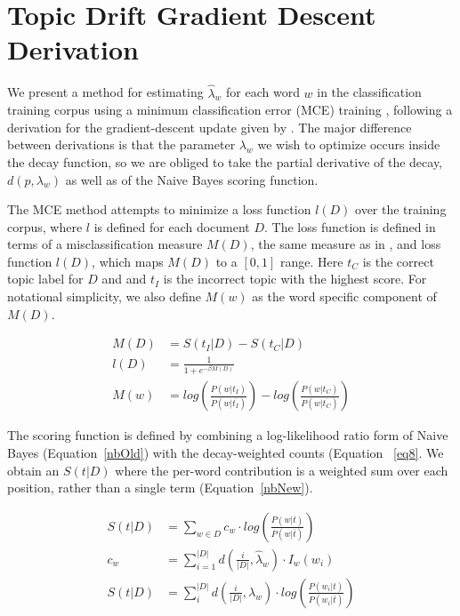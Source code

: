 \newpage
\appendix
\chapter{Topic Drift Gradient Descent Derivation} 

We present a method for estimating $\widehat{\lambda}_w$ for each word $w$ in the classification training corpus using a minimum classification error (MCE) training \cite{juang1992}, following a derivation for the gradient-descent update given by \cite{hazen2008}.   The major difference between derivations is that the parameter $\lambda_w$ we wish to optimize occurs inside the decay function, so we are obliged to take the partial derivative of the decay, $d(p,\lambda_w)$ as well as of the Naive Bayes scoring function. 

The MCE method attempts to minimize a loss function $l(D)$ over the training corpus, where $l$ is defined for each document $D$.  The loss function is defined in terms of a misclassification measure $M(D)$, the same measure as in \cite{hazen2008}, and loss function $l(D)$, which maps $M(D)$ to a $[0,1]$ range.   Here $t_C$ is the correct topic label for $D$ and and $t_I$ is the incorrect topic with the highest score.  For notational simplicity, we also define $M(w)$ as the word specific component of $M(D)$.

\begin{align}
M(D) &= S(t_I|D)- S(t_C|D)\\
l(D) &= \frac{1}{1 + e^{-\beta M(D)}}\\
M(w) &= log\left(\frac{P(w|t_I)}{P(w|\overline{t_I})}\right) - log\left(\frac{P(w|t_C)}{P(w|\overline{t_C})}\right)                    
\end{align}                                                                      

The scoring function is defined by combining a log-likelihood ratio form of Naive Bayes (Equation~\ref{nbOld}) with the decay-weighted counts (Equation ~\ref{eq8}.  We obtain an $S(t|D)$ where the per-word contribution is a weighted sum over each position, rather than a single term (Equation~\ref{nbNew}).

\begin{align}                                                                   
S(t|D) &= \sum_{w\in D}{c_w\cdot log \left(\frac{P(w|t)}{P(w|\overline{t})}\right)} \label{nbOld}\\
c_w &= \sum_{i=1}^{|D|}{d(\frac{i}{|D|},\widehat{\lambda}_w) \cdot I_{w}(w_i)} \label{eq8} \\
S(t|D) &= \sum_i^{|D|}{d(\frac{i}{|D|},\lambda_w) \cdot log \left(\frac{P(w_i|t)}{P(w_i|\overline{t})}\right)} \label{nbNew}
\end{align}                                                                      

